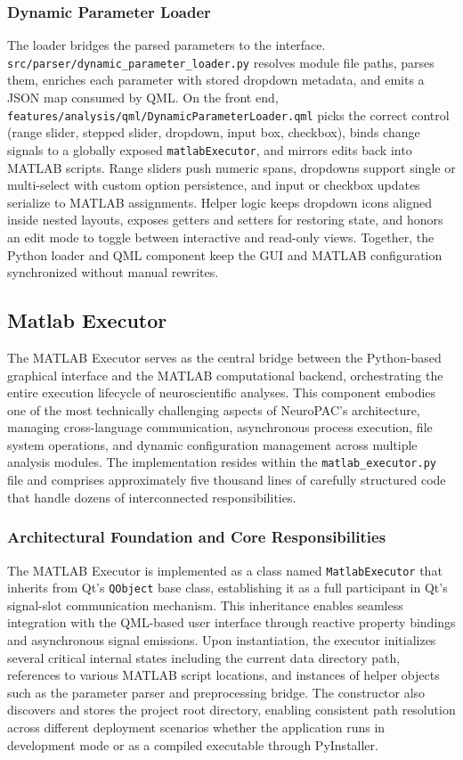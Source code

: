 \documentclass[12pt]{report}
\begin{document}
\subsubsection{Dynamic Parameter Loader}

The loader bridges the parsed parameters to the interface. \verb|src/parser/dynamic_parameter_loader.py| resolves module file paths, parses them, enriches each parameter with stored dropdown metadata, and emits a JSON map consumed by QML. On the front end, \verb|features/analysis/qml/DynamicParameterLoader.qml| picks the correct control (range slider, stepped slider, dropdown, input box, checkbox), binds change signals to a globally exposed \verb|matlabExecutor|, and mirrors edits back into MATLAB scripts. Range sliders push numeric spans, dropdowns support single or multi-select with custom option persistence, and input or checkbox updates serialize to MATLAB assignments. Helper logic keeps dropdown icons aligned inside nested layouts, exposes getters and setters for restoring state, and honors an edit mode to toggle between interactive and read-only views. Together, the Python loader and QML component keep the GUI and MATLAB configuration synchronized without manual rewrites.


\subsection{Matlab Executor}

The MATLAB Executor serves as the central bridge between the Python-based graphical interface and the MATLAB computational backend, orchestrating the entire execution lifecycle of neuroscientific analyses. This component embodies one of the most technically challenging aspects of NeuroPAC's architecture, managing cross-language communication, asynchronous process execution, file system operations, and dynamic configuration management across multiple analysis modules. The implementation resides within the \verb|matlab_executor.py| file and comprises approximately five thousand lines of carefully structured code that handle dozens of interconnected responsibilities.

\subsubsection{Architectural Foundation and Core Responsibilities}

The MATLAB Executor is implemented as a class named \verb|MatlabExecutor| that inherits from Qt's \verb|QObject| base class, establishing it as a full participant in Qt's signal-slot communication mechanism. This inheritance enables seamless integration with the QML-based user interface through reactive property bindings and asynchronous signal emissions. Upon instantiation, the executor initializes several critical internal states including the current data directory path, references to various MATLAB script locations, and instances of helper objects such as the parameter parser and preprocessing bridge. The constructor also discovers and stores the project root directory, enabling consistent path resolution across different deployment scenarios whether the application runs in development mode or as a compiled executable through PyInstaller.
\end{document}

